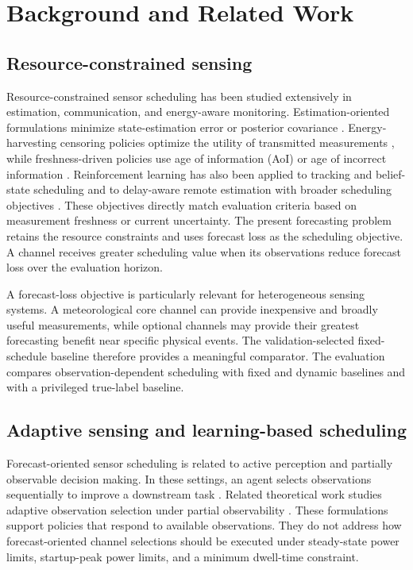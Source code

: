 \section{Background and Related Work}

\subsection{Resource-constrained sensing}

Resource-constrained sensor scheduling has been studied extensively in estimation,
communication, and energy-aware monitoring. Estimation-oriented formulations
minimize state-estimation error or posterior covariance
\citep{Shi_2011,AlAhdab2025}. Energy-harvesting censoring policies optimize the
utility of transmitted measurements \citep{FernandezBes2015}, while
freshness-driven policies use age of information (AoI) or age of incorrect
information \citep{Kaul_2012,Jonah2026}. Reinforcement learning has also been
applied to tracking and belief-state scheduling \citep{Qu2022,Alali2024} and to
delay-aware remote estimation with broader scheduling objectives
\citep{Tran2026}. These objectives directly match evaluation criteria based on
measurement freshness or current uncertainty. The present forecasting problem
retains the resource constraints and uses forecast loss as the scheduling
objective. A channel receives greater scheduling value when its observations
reduce forecast loss over the evaluation horizon.

A forecast-loss objective is particularly relevant for heterogeneous sensing
systems. A meteorological core channel can provide inexpensive and broadly useful
measurements, while optional channels may provide their greatest forecasting
benefit near specific physical events. The validation-selected fixed-schedule
baseline therefore provides a meaningful comparator. The evaluation compares observation-dependent
scheduling with fixed and dynamic baselines and with a privileged true-label baseline.



\subsection{Adaptive sensing and learning-based scheduling}

Forecast-oriented sensor scheduling is related to active perception and partially
observable decision making. In these settings, an agent selects observations
sequentially to improve a downstream task
\citep{Bajcsy2018,Lauri_2023}. Related theoretical work studies adaptive
observation selection under partial observability \citep{Golovin2011}. These
formulations support policies that respond to available observations. They do not
address how forecast-oriented channel selections should be executed under
steady-state power limits, startup-peak power limits, and a minimum dwell-time
constraint.

